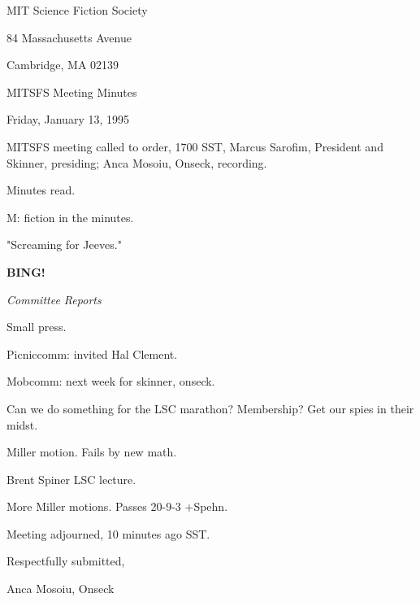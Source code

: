 \documentclass[12pt]{article}
\newcommand{\bing}{{\bf BING!} }
\newcommand{\goto}[1]{\bing \vskip 12pt \centerline{{\em{#1}}}}
\begin{document}
\begin{center}

MIT Science Fiction Society 

84 Massachusetts Avenue

Cambridge, MA 02139

\vspace{12pt}

MITSFS Meeting Minutes 

Friday, January 13, 1995

\end{center}
 
\vspace{18pt}

\setlength{\parskip}{6pt}

\noindent
MITSFS meeting called to order, 1700 SST,
Marcus Sarofim, President and Skinner, presiding; Anca Mosoiu, Onseck, recording.

Minutes read.

M: fiction in the minutes.

"Screaming for Jeeves."

\goto{Committee Reports}

Small press.

Picniccomm: invited Hal Clement.

Mobcomm: next week for skinner, onseck.

Can we do something for the LSC marathon? Membership? Get our spies in their midst.

Miller motion. Fails by new math.

Brent Spiner LSC lecture.

More Miller motions. Passes 20-9-3 +Spehn.

\vspace{12pt}

\noindent
Meeting adjourned, 10 minutes ago SST.

\vspace{18pt}

\centerline{Respectfully submitted,}
\centerline{Anca Mosoiu, Onseck}
\end{document}
